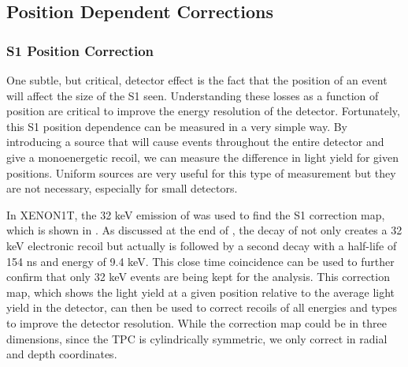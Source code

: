 \subsection{Position Dependent Corrections}
\label{sec:xe1t_pos_dependent_corrections}

\subsubsection{S1 Position Correction}
\label{sec:xe1t_lce_pos_correction}

One subtle, but critical, detector effect is the fact that the position of an event will affect the size of the S1 seen.  Understanding these losses as a function of position are critical to improve the energy resolution of the detector.  Fortunately, this S1 position dependence can be measured in a very simple way.  By introducing a source that will cause events throughout the entire detector and give a monoenergetic recoil, we can measure the difference in light yield for given positions.  Uniform sources are very useful for this type of measurement but they are not necessary, especially for small detectors.

In XENON1T, the 32 keV emission of  was used to find the S1 correction map, which is shown in .  As discussed at the end of , the decay of  not only creates a 32 keV electronic recoil but actually is followed by a second decay with a half-life of 154 ns and energy of 9.4 keV.  This close time coincidence can be used to further confirm that only 32 keV events are being kept for the analysis.  This correction map, which shows the light yield at a given position relative to the average light yield in the detector, can then be used to correct recoils of all energies and types to improve the detector resolution.  While the correction map could be in three dimensions, since the TPC is cylindrically symmetric, we only correct in radial and depth coordinates.


